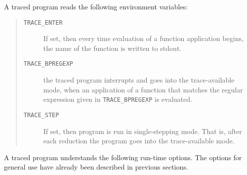 \documentclass[12pt]{article}
\begin{document}
\noindent
A traced program reads the following environment variables:
\begin{quote}
\begin{description}
\item[\texttt{TRACE\_ENTER}] 
If set, then every time evaluation of a function application begins, the name of the function is written to stdout.  

\item[\texttt{TRACE\_BPREGEXP}]
 the traced program interrupts and goes into the trace-available mode, when an application of a function that matches the regular expression given in \texttt{TRACE\_BPREGEXP} is evaluated.

\item[\texttt{TRACE\_STEP}] 
If set, then program is run in single-stepping mode. That is, after each reduction the program goes into the trace-available mode.
\end{description}
\end{quote}

A traced program understands the following run-time options.
The options for general use have already been described in previous sections.
\end{document}

